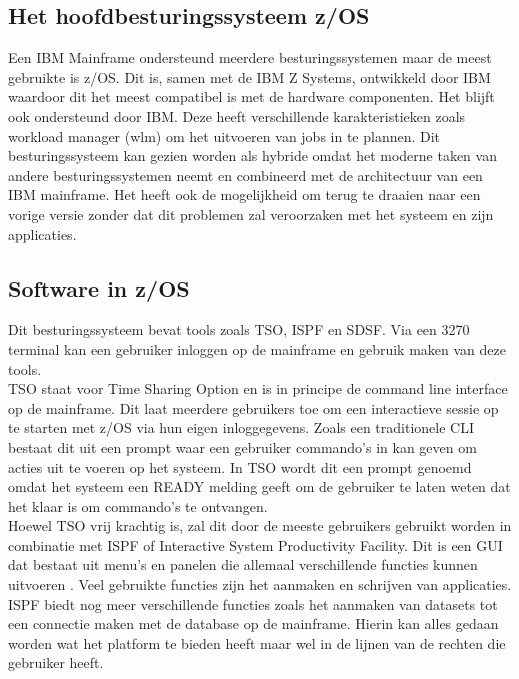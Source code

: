 \subsection{Het hoofdbesturingssysteem z/OS}
Een IBM Mainframe ondersteund meerdere besturingssystemen maar de meest gebruikte is z/OS. Dit is, samen met de IBM Z Systems, ontwikkeld door IBM waardoor dit het meest compatibel is met de hardware componenten. Het blijft ook ondersteund door IBM. Deze heeft verschillende karakteristieken zoals workload manager (wlm) om het uitvoeren van jobs in te plannen. Dit besturingssysteem kan gezien worden als hybride omdat het moderne taken van andere besturingssystemen neemt en combineerd met de architectuur van een IBM mainframe. Het heeft ook de mogelijkheid om terug te draaien naar een vorige versie zonder dat dit problemen zal veroorzaken met het systeem en zijn applicaties. \autocite{Rupp2022} 

\subsection{Software in z/OS}
Dit besturingssysteem bevat tools zoals TSO, ISPF en SDSF. Via een 3270 terminal kan een gebruiker inloggen op de mainframe en gebruik maken van deze tools. \\

TSO staat voor Time Sharing Option en is in principe de command line interface op de mainframe. Dit laat meerdere gebruikers toe om een interactieve sessie op te starten met z/OS via hun eigen inloggegevens. Zoals een traditionele CLI bestaat dit uit een prompt waar een gebruiker commando's in kan geven om acties uit te voeren op het systeem. In TSO wordt dit een  prompt genoemd omdat het systeem een READY melding geeft om de gebruiker te laten weten dat het klaar is om commando's te ontvangen. \autocite{IBM} \\

Hoewel TSO vrij krachtig is, zal dit door de meeste gebruikers gebruikt worden in combinatie met ISPF of Interactive System Productivity Facility. Dit is een GUI dat bestaat uit menu's en panelen die allemaal verschillende functies kunnen uitvoeren \autocite{IBM}. Veel gebruikte functies zijn het aanmaken en schrijven van applicaties. ISPF biedt nog meer verschillende functies zoals het aanmaken van datasets tot een connectie maken met de database op de mainframe. Hierin kan alles gedaan worden wat het platform te bieden heeft maar wel in de lijnen van de rechten die gebruiker heeft. \autocite{IBM} \\

